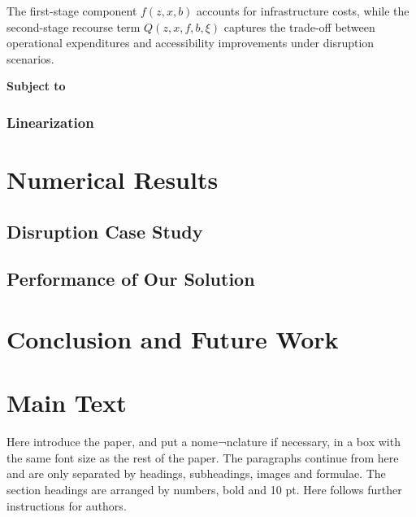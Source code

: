 \documentclass[3p,times,procedia]{elsarticle}
\begin{document}
The first-stage component $f(z,x,b)$ accounts for infrastructure costs, while the second-stage recourse term $Q(z,x,f,b,\xi)$ captures the trade-off between operational expenditures and accessibility improvements under disruption scenarios.


\textbf{Subject to}

\subsubsection{Linearization}
\section{Numerical Results}
\subsection{Disruption Case Study}
\subsection{Performance of Our Solution}
\section{Conclusion and Future Work}


\newpage
\section{Main Text}
\label{main}

Here introduce the paper, and put a nome¬nclature if necessary, in a box with the same font size as the rest of the paper. The paragraphs continue from here and are only separated by headings, subheadings, images and formulae. The section headings are arranged by numbers, bold and 10 pt. Here follows further instructions for authors.

\begin{nomenclature}
\begin{deflist}[A]
\end{deflist}
\end{nomenclature}\vspace*{-12pt}
\end{document}
